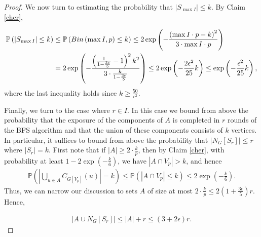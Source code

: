 \documentclass[notitlepage]{scrartcl}
\begin{document}
\begin{proof}
    We now turn to estimating the probability that $|S_{\max I}|\le k$. By Claim \ref{cher},
    
    \begin{align}\label{end}
    \notag
    \mathbb{P}\left(|S_{\max I}|\le k\right)&\le\mathbb{P}\left(Bin\left(\max I,p\right)\le k\right)\le 2\exp\left(-\frac{\left(\max I\cdot p-k\right)^2}{3\cdot \max I\cdot p}\right)\\
    &=2\exp\left(-\frac{\left(\frac{1}{1-\frac{3\epsilon}{5}}-1\right)^2k^2}{3\cdot \frac{k}{1-\frac{3\epsilon}{5}}}\right)\le 2\exp\left(-\frac{2\epsilon^2}{25}k\right)\le \exp\left(-\frac{\epsilon^2}{25}k\right),
    \end{align}
    where the last inequality holds since $k\ge \frac{50}{\epsilon^2}$. 
    
    Finally, we turn to the case where $r\in I$. In this case we bound from above the probability that the exposure of the components of $A$ is completed in $r$ rounds of the BFS algorithm and that the union of these components consists of $k$ vertices. In particular, it suffices to bound from above the probability that $|N_G[S_r]|\le r$ where $|S_r|=k$. First note that if $|A|\ge 2\cdot \frac{k}{p}$, then by Claim \ref{cher}, with probability at least $1-2\exp\left(-\frac{k}{6}\right)$, we have $|A\cap V_p|>k$, and hence 
    \begin{align*}
        \mathbb{P}\left(\left|\bigcup_{u\in A} C_{G[V_p]}(u)\right|=k\right)\le \mathbb{P}\left(|A\cap V_p|\le k\right)\le 2\exp\left(-\frac{k}{6}\right).
    \end{align*}
    Thus, we can narrow our discussion to sets $A$ of size at most $2\cdot \frac{k}{p}\le 2\left(1+\frac{3\epsilon}{5}\right)r$. Hence,

    \begin{align}\label{neighborhood}
        |A\cup N_G[S_r]|\le |A|+r\le (3+2\epsilon)r.
    \end{align}


\end{proof}
\end{document}
